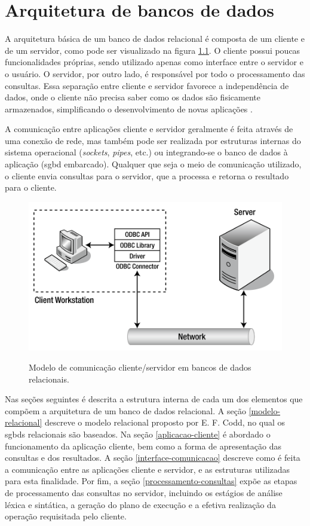 \chapter{Arquitetura de bancos de dados}
\label{arquitetura-bd}

A arquitetura básica de um banco de dados relacional é composta de um cliente e de um servidor, como pode ser visualizado na figura \ref{fig:client-server}. O cliente possui poucas funcionalidades próprias, sendo utilizado apenas como interface entre o servidor e o usuário. O servidor, por outro lado, é responsável por todo o processamento das consultas. Essa separação entre cliente e servidor favorece a independência de dados, onde o cliente não precisa saber como os dados são fisicamente armazenados, simplificando o desenvolvimento de novas aplicações \cite[p. 30]{Bell:2012}.

A comunicação entre aplicações cliente e servidor geralmente é feita através de uma conexão de rede, mas também pode ser realizada por estruturas internas do sistema operacional (\emph{sockets}, \emph{pipes}, etc.) ou integrando-se o banco de dados à aplicação (\gls{sgbd} embarcado). Qualquer que seja o meio de comunicação utilizado, o cliente envia consultas para o servidor, que a processa e retorna o resultado para o cliente.

\begin{figure}[H]
  \centering
  \caption{Modelo de comunicação cliente/servidor em bancos de dados relacionais.}
  \includegraphics[width=.65\textwidth]{images/client-server-model.png}
  \label{fig:client-server}
\end{figure}

Nas seções seguintes é descrita a estrutura interna de cada um dos elementos que compõem a arquitetura de um banco de dados relacional. A seção \ref{modelo-relacional} descreve o modelo relacional proposto por E. F. Codd, no qual os \glspl{sgbd} relacionais são baseados. Na seção \ref{aplicacao-cliente} é abordado o funcionamento da aplicação cliente, bem como a forma de apresentação das consultas e dos resultados. A seção \ref{interface-comunicacao} descreve como é feita a comunicação entre as aplicações cliente e servidor, e as estruturas utilizadas para esta finalidade. Por fim, a seção \ref{processamento-consultas} expõe as etapas de processamento das consultas no servidor, incluindo os estágios de análise léxica e sintática, a geração do plano de execução e a efetiva realização da operação requisitada pelo cliente.



